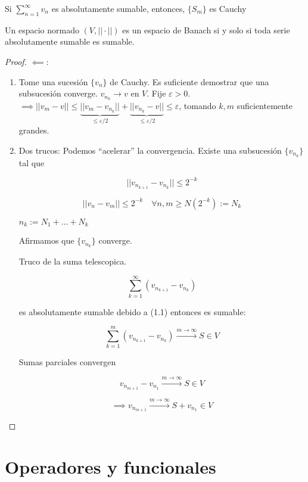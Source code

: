 \documentclass[../Apunte.tex]{subfiles}
\begin{document}
\begin{fproposition}
    Si $\displaystyle\sum_{n=1}^\infty v_n$ es absolutamente sumable, entonces, $\{S_m\}$ es Cauchy
\end{fproposition}

\begin{ftheorem}
    Un espacio normado $(V,||\cdot||)$ es un espacio de Banach si y solo si toda serie absolutamente sumable es sumable.
\end{ftheorem}

\begin{proof}
    $\impliedby:$ \begin{enumerate}
        \item Tome una sucesión $\{v_n\}$ de Cauchy. Es suficiente demostrar que una subsucesión converge. $v_{n_k}\to v$ en $V$. Fije $\varepsilon>0$.
        $\implies ||v_m-v||\leq \underbrace{||v_m-v_{n_k}||}_{\leq \varepsilon/2}+\underbrace{||v_{n_k}-v||}_{\leq \varepsilon/2}\leq \varepsilon$, tomando $k,m$ suficientemente grandes.

        \item Dos trucos: Podemos ``acelerar'' la convergencia. Existe una subsucesión $\{v_{n_k}\}$ tal que 
        
        \begin{equation}||v_{n_{k+1}}-v_{n_k}||\leq 2^{-k}\end{equation}

        \[||v_n-v_m||\leq 2^{-k}\quad \forall n,m\geq N(2^{-k}):=N_k\]

        $n_k:=N_1+\ldots+N_k$

        Afirmamos que $\{v_{n_k}\}$ converge.

        Truco de la suma telescopica.

        \[\sum_{k=1}^\infty (v_{n_{k+1}}-v_{n_k})\]

        es absolutamente sumable debido a (1.1) entonces es sumable:

        \[\sum_{k=1}^m (v_{n_{k+1}}-v_{n_k})\xrightarrow{m\to\infty} S\in V\]

        Sumas parciales convergen 

        \[v_{n_{m+1}}-v_{n_1}\xrightarrow{m\to\infty}S\in V\]

        \[\implies v_{n_{m+1}}\xrightarrow{m\to\infty}S+v_{n_1}\in V\]

    \end{enumerate}
\end{proof}

\section{Operadores y funcionales}
\end{document}
